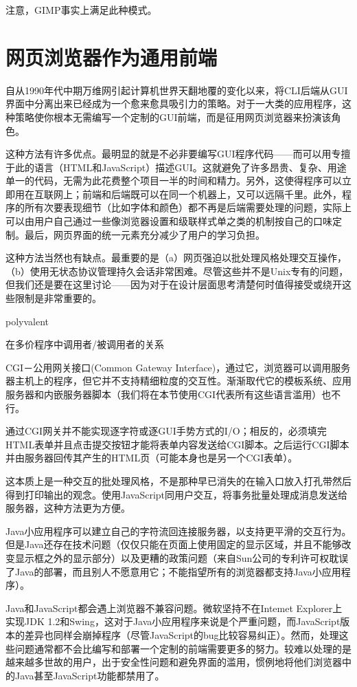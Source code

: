 \documentclass[12pt,oneside]{book}
\begin{document}
\begin{common-format}
注意，GIMP事实上满足此种模式。

\section{网页浏览器作为通用前端}
自从1990年代中期万维网引起计算机世界天翻地覆的变化以来，将CLI后端从GUI界面中分离出来已经成为一个愈来愈具吸引力的策略。对于一大类的应用程序，这种策略使你根本无需编写一个定制的GUI前端，而是征用网页浏览器来扮演该角色。

这种方法有许多优点。最明显的就是不必非要编写GUI程序代码——而可以用专擅于此的语言（HTML和JavaScript）描述GUI。这就避免了许多昂贵、复杂、用途单一的代码，无需为此花费整个项目一半的时间和精力。另外，这使得程序可以立即用在互联网上；前端和后端既可以在同一个机器上，又可以远隔千里。此外，程序的所有次要表现细节（比如字体和颜色）都不再是后端需要处理的问题，实际上可以由用户自己通过一些像浏览器设置和级联样式单之类的机制按自己的口味定制。最后，网页界面的统一元素充分减少了用户的学习负担。

这种方法当然也有缺点。最重要的是（a）网页强迫以批处理风格处理交互操作，（b）使用无状态协议管理持久会话非常困难。尽管这些并不是Unix专有的问题，但我们还是要在这里讨论——因为对于在设计层面思考清楚何时值得接受或绕开这些限制是非常重要的。

\begin{fig}{polyvalent}
\caption{在多价程序中调用者/被调用者的关系}
\label{fig:polyvalent}
\end{fig}

CGI－公用网关接口(Common Gateway Interface)，通过它，浏览器可以调用服务器主机上的程序，但它并不支持精细粒度的交互性。渐渐取代它的模板系统、应用服务器和内嵌服务器脚本（我们将在本节使用CGI代表所有这些语言滥用）也不行。

通过CGI网关并不能实现逐字符或逐GUI手势方式的I/O；相反的，必须填完HTML表单并且点击提交按钮才能将表单内容发送给CGI脚本。之后运行CGI脚本并由服务器回传其产生的HTML页（可能本身也是另一个CGI表单）。

这本质上是一种交互的批处理风格，不是那种早已消失的在输入口放入打孔带然后得到打印输出的观念。使用JavaScript同用户交互，将事务批量处理成消息发送给服务器，这种方法更为方便。

Java小应用程序可以建立自己的字符流回连接服务器，以支持更平滑的交互行为。但是Java还存在技术问题（仅仅只能在页面上使用固定的显示区域，并且不能够改变显示框之外的显示部分）以及更糟的政策问题（来自Sun公司的专利许可权耽误了Java的部署，而且别人不愿意用它；不能指望所有的浏览器都支持Java小应用程序）。

Java和JavaScript都会遇上浏览器不兼容问题。微软坚持不在Intemet Explorer上实现JDK 1.2和Swing，这对于Java小应用程序来说是个严重问题，而JavaScript版本的差异也同样会崩掉程序（尽管JavaScript的bug比较容易纠正）。然而，处理这些问题通常都不会比编写和部署一个定制的前端需要更多的努力。较难以处理的是越来越多世故的用户，出于安全性问题和避免界面的滥用，惯例地将他们浏览器中的Java甚至JavaScript功能都禁用了。


\end{common-format}
\end{document}

